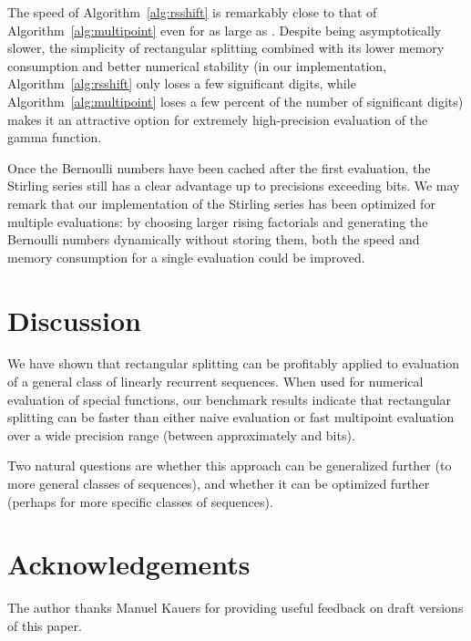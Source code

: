 \documentclass{sig-alternate}
\begin{document}
The speed of Algorithm~\ref{alg:rsshift} is remarkably close to
that of Algorithm~\ref{alg:multipoint} even for 
as large as .
Despite being asymptotically slower, the
simplicity of rectangular splitting
combined with its lower memory consumption and better
numerical stability (in our implementation, Algorithm~\ref{alg:rsshift}
only loses a few significant digits,
while Algorithm~\ref{alg:multipoint} loses a few percent of the number of significant digits)
makes it an attractive option for extremely high-precision
evaluation of the gamma function.

Once the Bernoulli numbers have been cached after the first evaluation, the Stirling series
still has a clear advantage up to precisions exceeding  bits.
We may remark that our implementation of the Stirling series
has been optimized for multiple evaluations: by choosing
larger rising factorials and generating the Bernoulli numbers dynamically
without storing them, both the speed and memory consumption
for a single evaluation could be improved.

\section{Discussion}

We have shown that rectangular splitting can be profitably
applied to evaluation of a general class of linearly recurrent sequences.
When used for numerical evaluation of special functions, our benchmark results
indicate that rectangular splitting can be faster than either naive evaluation
or fast multipoint evaluation over a wide precision range
(between approximately  and  bits).

Two natural questions are whether this approach can be generalized
further (to more general classes of sequences), and whether
it can be optimized further (perhaps for more specific classes
of sequences).

\section{Acknowledgements}

The author thanks Manuel Kauers for providing
useful feedback on draft versions of this paper.



\end{document}
